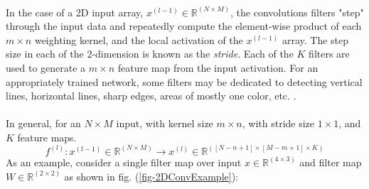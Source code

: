 \documentclass[12pt,letterpaper]{article}
\begin{document}
\paragraph*{}In the case of a 2D input array, $x^{(l-1)} \in \mathbb{R}^{(N \times M)}$, the convolutions filters "step" through the input data and repeatedly compute the element-wise product of each $m \times n$ weighting kernel, and the local activation of the $x^{(l-1)}$ array. The step size in each of the 2-dimension is known as the \textit{stride}. Each of the $K$ filters are used to generate a $m \times n$ feature map from the input activation. For an appropriately trained network, some filters may be dedicated to detecting vertical lines, horizontal lines, sharp edges, areas of mostly one color, etc. \cite{Geron,Loy}.

\paragraph*{}In general, for an $N \times M$ input, with kernel size $m \times n$, with stride size $1 \times 1$, and $K$ feature maps.
\begin{equation}
f^{(l)} : x^{(l-1)} \in \mathbb{R}^{(N \times M)} \rightarrow
x^{(l)} \in \mathbb{R}^{([N-n+1] \times [M-m+1] \times K)}
\end{equation}
As an example, consider a single filter map over input $x \in \mathbb{R}^{(4 \times 3)}$ and filter map $W \in \mathbb{R}^{(2 \times 2)}$ as shown in fig. (\ref{fig-2DConvExample}):
\end{document}
